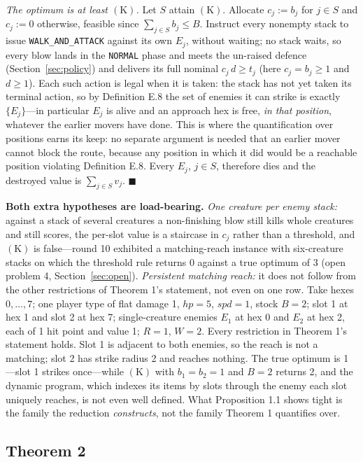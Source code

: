\documentclass[11pt,a4paper]{article}
\theoremstyle{plain}
\theoremstyle{definition}
\theoremstyle{plain}
\theoremstyle{definition}
\theoremstyle{remark}
\newcommand{\qedbox}{\hfill$\blacksquare$}
\begin{document}
\emph{The optimum is at least $(\mathrm{K})$.} Let $S$ attain $(\mathrm{K})$. Allocate
$c_j:=b_j$ for $j\in S$ and $c_j:=0$ otherwise, feasible since $\sum_{j\in S}b_j\le B$.
Instruct every nonempty stack to issue \texttt{WALK\_AND\_ATTACK} against its own $E_j$,
without waiting; no stack waits, so every blow lands in the \texttt{NORMAL} phase and meets
the un-raised defence (Section~\ref{sec:policy}) and delivers its full nominal
$c_j\,d\ge t_j$ (here $c_j=b_j\ge 1$ and $d\ge 1$). Each such action is legal when it is
taken: the stack has not yet taken its terminal action, so by Definition E.8 the set of
enemies it can strike is exactly $\{E_j\}$---in particular $E_j$ is alive and an approach hex
is free, \emph{in that position}, whatever the earlier movers have done. This is where the
quantification over positions earns its keep: no separate argument is needed that an earlier
mover cannot block the route, because any position in which it did would be a reachable
position violating Definition E.8. Every $E_j$, $j\in S$, therefore dies and the destroyed
value is $\sum_{j\in S}v_j$. \qedbox

\smallskip
\noindent\textbf{Both extra hypotheses are load-bearing.} \emph{One creature per enemy
stack:} against a stack of several creatures a non-finishing blow still kills whole creatures
and still scores, the per-slot value is a staircase in $c_j$ rather than a threshold, and
$(\mathrm{K})$ is false---round 10 exhibited a matching-reach instance with six-creature
stacks on which the threshold rule returns 0 against a true optimum of 3 (open problem 4,
Section~\ref{sec:open}). \emph{Persistent matching reach:} it does not follow from the other
restrictions of Theorem 1's statement, not even on one row. Take hexes $0,\dots,7$; one
player type of flat damage 1, $\mathit{hp}=5$, $\mathit{spd}=1$, stock $B=2$; slot 1 at hex
1 and slot 2 at hex 7; single-creature enemies $E_1$ at hex 0 and $E_2$ at hex 2, each of 1
hit point and value 1; $R=1$, $W=2$. Every restriction in Theorem 1's statement holds. Slot
1 is adjacent to both enemies, so the reach is not a matching; slot 2 has strike radius 2
and reaches nothing. The true optimum is 1---slot 1 strikes once---while $(\mathrm{K})$ with
$b_1=b_2=1$ and $B=2$ returns 2, and the dynamic program, which indexes its items by slots
through the enemy each slot uniquely reaches, is not even well defined. What Proposition 1.1
shows tight is the family the reduction \emph{constructs}, not the family Theorem 1
quantifies over.

\subsection*{Theorem 2}
\end{document}
